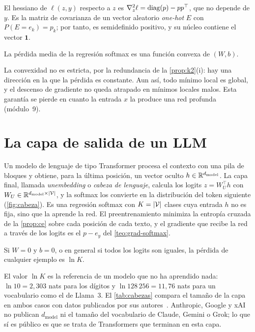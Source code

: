 \begin{proposicion}\label{prop:hess-softmax}
El hessiano de $\ell(z,y)$ respecto a $z$ es $\nabla_z^{2}\ell=\operatorname{diag}(p)-pp^{\top}$, que no depende de $y$. Es la matriz de covarianza de un vector aleatorio \emph{one-hot} $E$ con $P(E=e_k)=p_k$; por tanto, es semidefinido positivo, y su núcleo contiene el vector $\mathbf{1}$.
\end{proposicion}

\begin{corolario}\label{cor:convexa-softmax}
La pérdida media de la regresión softmax es una función convexa de $(W,b)$.
\end{corolario}

La convexidad no es estricta, por la redundancia de la \cref{prop:k2}(i): hay una dirección en la que la pérdida es constante. Aun así, todo mínimo local es global, y el descenso de gradiente no queda atrapado en mínimos locales malos. Esta garantía se pierde en cuanto la entrada $x$ la produce una red profunda (módulo~9).

\section{La capa de salida de un LLM}

Un modelo de lenguaje de tipo Transformer procesa el contexto con una pila de bloques y obtiene, para la última posición, un vector oculto $h\in\mathbb{R}^{d_{\text{model}}}$. La capa final, llamada \emph{unembedding} o \emph{cabeza de lenguaje}, calcula los logits $z=W_U^{\top}h$ con $W_U\in\mathbb{R}^{d_{\text{model}}\times\lvert\mathcal{V}\rvert}$, y la softmax los convierte en la distribución del token siguiente (\cref{fig:cabeza}). Es una regresión softmax con $K=\lvert\mathcal{V}\rvert$ clases cuya entrada $h$ no es fija, sino que la aprende la red. El preentrenamiento minimiza la entropía cruzada de la \cref{prop:ce} sobre cada posición de cada texto, y el gradiente que recibe la red a través de los logits es el $p-e_y$ del \cref{teo:grad-softmax}.

\addtocounter{figure}{1}%

\begin{proposicion}\label{prop:inicial}
Si $W=0$ y $b=0$, o en general si todos los logits son iguales, la pérdida de cualquier ejemplo es $\ln K$.
\end{proposicion}

El valor $\ln K$ es la referencia de un modelo que no ha aprendido nada: $\ln 10=2{,}303$ nats para los dígitos y $\ln 128\,256=11{,}76$ nats para un vocabulario como el de Llama~3. El \cref{tab:cabezas} compara el tamaño de la capa en ambos casos con datos publicados por sus autores~\cite{llama2,llama3}. Anthropic, Google y xAI no publican $d_{\text{model}}$ ni el tamaño del vocabulario de Claude, Gemini o Grok; lo que sí es público es que se trata de Transformers que terminan en esta capa.


